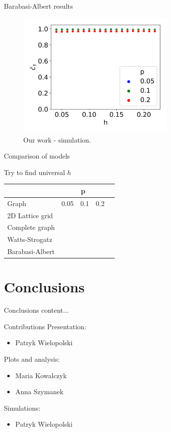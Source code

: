 \documentclass[10pt]{beamer}
\begin{document}
\begin{frame}{Barabasi-Albert results}
	\begin{figure}
		\includegraphics[width=0.7\textwidth]{../results/images/hp-barabasi-albert.png}
		\caption{Our work - simulation.}
	\end{figure}
\end{frame}

\begin{frame}{Comparison of models}
	
	Try to find universal $h$
	\begin{table}[]
		\begin{tabular}{l|llll}
			& \multicolumn{3}{c}{p} &  \\
			\hline
			Graph           & 0.05   & 0.1   & 0.2  &  \\
			\hline
			2D Lattice grid &        &       &      &  \\
			Complete graph  &        &       &      &  \\
			Watts-Strogatz  &        &       &      &  \\
			Barabasi-Albert &        &       &      & 
		\end{tabular}
	\end{table}
\end{frame}

\section{Conclusions}

\begin{frame}{Conclusions}
	content...
\end{frame}

\begin{frame}{Contributions}
	Presentation:
	\begin{itemize}
		\item Patryk Wielopolski
	\end{itemize}
	Plots and analysis:
	\begin{itemize}
		\item Maria Kowalczyk
		\item Anna Szymanek
	\end{itemize}
	Simulations:
	\begin{itemize}
		\item Patryk Wielopolski
	\end{itemize}
\end{frame}
\end{document}
